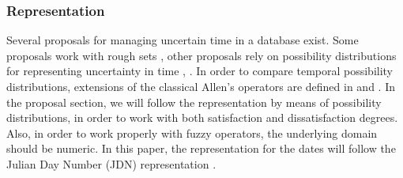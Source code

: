 % 

\subsubsection{Representation}
Several proposals for managing uncertain time in a database exist. Some proposals work with rough sets \cite{Qiang2009}, other proposals rely on possibility distributions for representing uncertainty in time \cite{Garrido2009}, \cite{Galindo2001}. In order to compare temporal possibility distributions, extensions of the classical Allen's operators \cite{Allen1983} are defined in \cite{Ohlbach2004} and \cite{Nagypal2003}. In the proposal section, we will follow the representation by means of possibility distributions, in order to work with both satisfaction and dissatisfaction degrees. Also, in order to work properly with fuzzy operators, the underlying domain should be numeric. In this paper, the representation for the dates will follow the Julian Day Number (JDN) representation \cite{Husfeld1996}.

